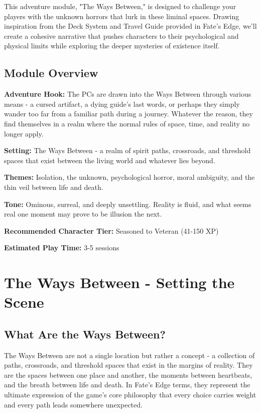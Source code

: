 \documentclass[11pt]{article}
\begin{document}
This adventure module, "The Ways Between," is designed to challenge your players with the unknown horrors that lurk in these liminal spaces. Drawing inspiration from the Deck System and Travel Guide provided in Fate's Edge, we'll create a cohesive narrative that pushes characters to their psychological and physical limits while exploring the deeper mysteries of existence itself.

\subsection{Module Overview}

\textbf{Adventure Hook:} The PCs are drawn into the Ways Between through various means - a cursed artifact, a dying guide's last words, or perhaps they simply wander too far from a familiar path during a journey. Whatever the reason, they find themselves in a realm where the normal rules of space, time, and reality no longer apply.

\textbf{Setting:} The Ways Between - a realm of spirit paths, crossroads, and threshold spaces that exist between the living world and whatever lies beyond.

\textbf{Themes:} Isolation, the unknown, psychological horror, moral ambiguity, and the thin veil between life and death.

\textbf{Tone:} Ominous, surreal, and deeply unsettling. Reality is fluid, and what seems real one moment may prove to be illusion the next.

\textbf{Recommended Character Tier:} Seasoned to Veteran (41-150 XP)

\textbf{Estimated Play Time:} 3-5 sessions

\section{The Ways Between - Setting the Scene}

\subsection{What Are the Ways Between?}

The Ways Between are not a single location but rather a concept - a collection of paths, crossroads, and threshold spaces that exist in the margins of reality. They are the spaces between one place and another, the moments between heartbeats, and the breath between life and death. In Fate's Edge terms, they represent the ultimate expression of the game's core philosophy that every choice carries weight and every path leads somewhere unexpected.
\end{document}
